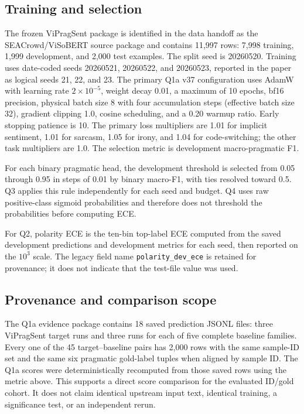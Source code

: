 \subsection{Training and selection}
The frozen ViPragSent package is identified in the data handoff as the SEACrowd/ViSoBERT source package and contains 11,997 rows: 7,998 training, 1,999 development, and 2,000 test examples. The split seed is 20260520. Training uses date-coded seeds 20260521, 20260522, and 20260523, reported in the paper as logical seeds 21, 22, and 23. The primary Q1a v37 configuration uses AdamW with learning rate $2\times10^{-5}$, weight decay 0.01, a maximum of 10 epochs, bf16 precision, physical batch size 8 with four accumulation steps (effective batch size 32), gradient clipping 1.0, cosine scheduling, and a 0.20 warmup ratio. Early stopping patience is 10. The primary loss multipliers are 1.01 for implicit sentiment, 1.01 for sarcasm, 1.05 for irony, and 1.04 for code-switching; the other task multipliers are 1.0. The selection metric is development macro-pragmatic F1.

For each binary pragmatic head, the development threshold is selected from 0.05 through 0.95 in steps of 0.01 by binary macro-F1, with ties resolved toward 0.5. Q3 applies this rule independently for each seed and budget. Q4 uses raw positive-class sigmoid probabilities and therefore does not threshold the probabilities before computing ECE.

For Q2, polarity ECE is the ten-bin top-label ECE computed from the saved development predictions and development metrics for each seed, then reported on the $10^3$ scale. The legacy field name \texttt{polarity\_dev\_ece} is retained for provenance; it does not indicate that the test-file value was used.

\subsection{Provenance and comparison scope}
The Q1a evidence package contains 18 saved prediction JSONL files: three ViPragSent target runs and three runs for each of five complete baseline families. Every one of the 45 target--baseline pairs has 2,000 rows with the same sample-ID set and the same six pragmatic gold-label tuples when aligned by sample ID. The Q1a scores were deterministically recomputed from those saved rows using the metric above. This supports a direct score comparison for the evaluated ID/gold cohort. It does not claim identical upstream input text, identical training, a significance test, or an independent rerun.
